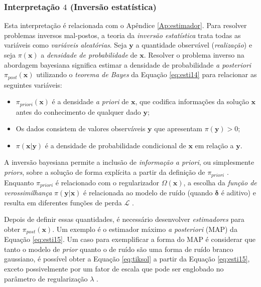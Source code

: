 \subsubsection{Interpretação $4$ (Inversão estatística)}

Esta interpretação é relacionada com o Apêndice \ref{Ap:estimador}. Para resolver problemas inversos mal-postos, a teoria da \textit{inversão estatística} trata todas as variáveis como \textit{variáveis aleatórias}. Seja $\mathbf{y}$ a quantidade observável (\textit{realização}) e seja $\pi(\mathbf{x})$ a \textit{densidade de probabilidade} de $\mathbf{x}$. Resolver o problema inverso na abordagem bayesiana significa estimar a densidade de probabilidade \textit{a posteriori} $\pi_{post}(\mathbf{x})$ \cite{kaipio2005statistical} utilizando o \textit{teorema de Bayes} da Equação \eqref{eq:esti14} para relacionar as seguintes variáveis:
\begin{itemize}
\item $\pi_{priori}(\mathbf{x})$ é a densidade \textit{a priori} de $\mathbf{x}$, que codifica informações da solução $\mathbf{x}$ antes do conhecimento de qualquer dado $\mathbf{y}$; 
\item Os dados consistem de valores observáveis $\mathbf{y}$ que apresentam $\pi\left(\mathbf{y} \right)>0$; 
\item $\pi\left(\mathbf{x} \vert \mathbf{y} \right)$ é a densidade de probabilidade condicional de $\mathbf{x}$ em relação a $\mathbf{y}$. 
\end{itemize}

A inversão bayesiana permite a inclusão de \textit{informação a priori}, ou simplesmente \textit{priors}, sobre a solução de forma explícita a partir da definição de $\pi_{priori}$ \cite{kaipio2005statistical}. Enquanto $\pi_{priori}$ é relacionado com o regularizador $\Omega(\mathbf{x})$, a escolha da \textit{função de verossimilhança} $\pi\left(\mathbf{y} \vert \mathbf{x} \right)$ é relacionada ao modelo de ruído (quando $\bm{\delta}$ é aditivo) e resulta em diferentes funções de perda $\mathcal{L}$ \cite{kaipio2005statistical}. 

 Depois de definir essas quantidades, é necessário desenvolver \textit{estimadores} para obter $\pi_{post}(\mathbf{x})$. Um exemplo é o estimador máximo \textit{a posteriori} (MAP) da Equação \eqref{eq:esti15}. Um caso para exemplificar a forma do MAP é considerar que tanto o modelo de \textit{prior} quanto o de ruído são uma forma de ruído branco gaussiano, é possível obter a Equação \eqref{eq:tiksol} a partir da Equação \eqref{eq:esti15}, exceto possivelmente por um fator de escala que pode ser englobado no parâmetro de regularização $\lambda$ \cite{kaipio2005statistical}. 

